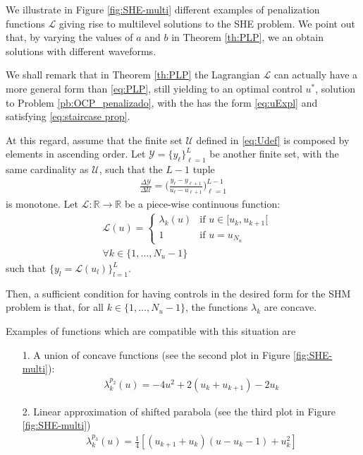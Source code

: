 \documentclass[twocolumn]{autart}    %
\begin{document}
We illustrate in Figure \ref{fig:SHE-multi} different examples of penalization functions $\mathcal{L}$ giving rise to multilevel solutions to the SHE problem. We point out that, by varying the values of $a$ and $b$ in Theorem \ref{th:PLP}, we an obtain solutions with different waveforms.

\begin{remark}

We shall remark that in Theorem \ref{th:PLP} the Lagrangian $\mathcal L$ can actually have a more general form than \eqref{eq:PLP}, still yielding to an optimal control $u^\ast$, solution to Problem \ref{pb:OCP_penalizado}, with the has the form \eqref{eq:uExpl} and satisfying \eqref{eq:staircase prop}.

At this regard, assume that the finite set $\mathcal{U}$ defined in \eqref{eq:Udef} is composed by elements in ascending order. Let $\mathcal{Y} = \{y_\ell\}_{\ell=1}^L$ be another finite set, with the same cardinality as $\mathcal U$, such that the $L-1$ tuple
\begin{align*}
	\frac{\Delta \mathcal{Y}}{\Delta \mathcal{U}} = \Bigg( \frac{y_\ell - y_{\ell+1}}{u_\ell - u_{\ell+1}} \Bigg)_{\ell=1}^{L-1}
\end{align*}
is monotone. Let $\mathcal{L}:\mathbb{R} \rightarrow \mathbb{R}$ be a piece-wise continuous function:
\begin{align*}
	&\mathcal{L}(u) = \begin{cases}
		\lambda_k(u) & \text{if }  u \in [u_k,u_{k+1}[ \\ 1 & \text{if } u = u_{N_u} 
    \end{cases} 
	\\[10pt]
	&\forall k \in \{1,\dots,N_u-1\}
\end{align*}    
such that $\{y_l = \mathcal{L}(u_l)\}_{l=1}^L$. 

Then, a sufficient condition for having controls in the desired form for the SHM problem is that, for all $k \in \{1,\dots,N_u-1\}$, the functions $\lambda_k$ are concave.

Examples of functions which are compatible with this situation are
\begin{enumerate}
    \item[1.] A union of concave functions (see the second plot in Figure \ref{fig:SHE-multi}):
    \begin{align*}
        \lambda_k^{p_2}(u) = -4u^2 + 2(u_k + u_{k+1}) - 2u_{k}
    \end{align*}
    \item[2.] Linear approximation of shifted parabola (see the third plot in Figure \ref{fig:SHE-multi})
    \begin{align*}
        \lambda_k^{p_3}(u) = \frac 1 4[(u_{k+1}+u_{k}) (u-u_k-1) + u_k^2]
    \end{align*}
\end{enumerate}


\end{remark}
\end{document}

